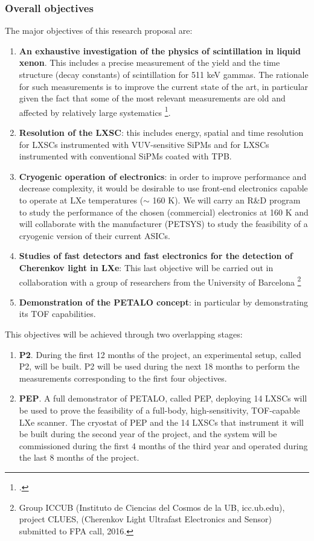 \subsubsection*{Overall objectives}
The major objectives of this research proposal are: 
\begin{enumerate}
\item {\bf An exhaustive investigation of the physics of scintillation in liquid xenon}. This includes a precise measurement of the yield and the time structure (decay constants) of scintillation for 511 keV gammas. The rationale for such measurements is to improve the current state of the art, in particular given the fact that some of the most relevant measurements are old and affected by relatively large systematics \footcite{Kubota79}. 
\item {\bf Resolution of the LXSC}: this includes energy, spatial and time resolution for LXSCs instrumented with VUV-sensitive SiPMs and for LXSCs instrumented with conventional SiPMs coated with TPB.
\item {\bf Cryogenic operation of electronics}: in order to improve performance and decrease complexity, it would be desirable to use front-end electronics capable to operate at LXe temperatures ($\sim$ 160 K). We will carry an R\&D program to study the performance of the chosen (commercial) electronics at 160 K and will collaborate with the manufacturer (PETSYS) to study the feasibility of a cryogenic version of their current ASICs. 
\item {\bf Studies of fast detectors and fast electronics for the detection of Cherenkov light in LXe}: This last objective will be carried out in collaboration with a group of researchers from the University of Barcelona \footnote{Group ICCUB (Instituto de Ciencias del Cosmos de la UB, icc.ub.edu), project CLUES, (Cherenkov Light Ultrafast Electronics and Sensor) submitted to FPA call, 2016.}
\item {\bf Demonstration of the PETALO concept}: in particular by demonstrating its TOF capabilities.   
\end{enumerate}

This objectives will be achieved through two overlapping stages:

\begin{enumerate}
\item {\bf P2}. During the first  12 months of the project, an experimental setup, called P2, will be built. P2 will be used during the next 18 months to perform the measurements corresponding to the first four objectives.  
\item {\bf PEP}. A full demonstrator of PETALO, called PEP, deploying 14 LXSCs will be used to prove the feasibility of a full-body, high-sensitivity, TOF-capable LXe scanner. The cryostat of PEP and the 14 LXSCs that instrument it will be built during the second year of the project, and the system will be commissioned during the first 4 months of the third year and operated during the last 8 months of the project.   
\end{enumerate}

